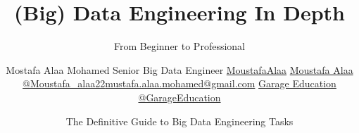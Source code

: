 \title[Data Engineering In Depth] %
{(Big) Data Engineering In Depth}

\subtitle{From Beginner to Professional}

\author[Moustafa Alaa] %
{Mostafa Alaa Mohamed \newline Senior Big Data Engineer \newline 
	\faGithub \space \href{https://github.com/moustafaalaa/}{MoustafaAlaa}	
	\faLinkedin \space \href{https://www.linkedin.com/in/moustafa-alaa/}{Moustafa Alaa}
	\faTwitter \space \href{https://twitter.com/moustafa_alaa22}{@Moustafa\_alaa22}\newline	\faEnvelope \space \href{mailto: mustafa.alaa.mohamed@gmail.com}{mustafa.alaa.mohamed@gmail.com}
	\newline
	\faYoutubePlay \space \href{https://youtube.com/c/GarageEducation}{Garage Education}
	\faTwitter \space \href{https://twitter.com/GarageEducation}{@GarageEducation}

}

\date[\today] %
{The Definitive Guide to Big Data Engineering Tasks}



